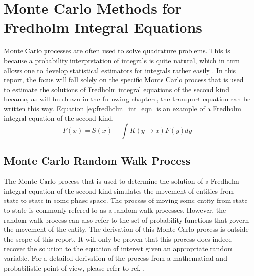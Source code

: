 \chapter{Monte Carlo Methods for Fredholm Integral Equations}
\label{ch:mc_methods}
Monte Carlo processes are often used to solve quadrature problems. This is 
because a probability interpretation of integrals is quite natural, which in
turn allows one to develop statistical estimators for integrals rather easily
\citep{spanier_monte_1969}.
In this report, the focus will fall solely on the specific Monte Carlo
process that is used to estimate the solutions of Fredholm integral
equations of the second kind because, as will be shown in the following 
chapters, the transport equation can be written this way. Equation
\ref{eq:fredholm_int_eqn} is an example of a Fredholm integral equation
of the second kind.
\begin{equation}
  F(x) = S(x) + \int K(y \to x) F(y)dy
\label{eq:fredholm_int_eqn}
\end{equation}

\section{Monte Carlo Random Walk Process}
\label{sec:mc_random_walk_process}
The Monte Carlo process that is used to determine the solution of a Fredholm
integral equation of the second kind simulates the movement of entities from
state to state in some phase space. The process of moving some entity from
state to state is commonly refered to as a random walk processes. However,
the random walk process can also refer to the set of probability functions
that govern the movement of the entity. The derivation of this Monte Carlo
process is outside the scope of this report. It will only be proven that this
process does indeed recover the solution to the equation of interest given an
appropriate random variable. For a detailed derivation of the process from a 
mathematical and probabilistic point of view, please refer to ref. 
\cite{spanier_monte_1969}. 

